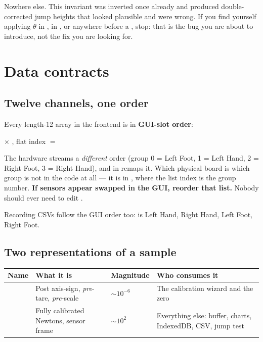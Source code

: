 \documentclass[11pt,a4paper]{article}
\begin{document}
Nowhere else. This invariant was inverted once already and produced
double-corrected jump heights that looked plausible and were wrong. If you find
yourself applying $\theta$ in , in ,
or anywhere before a , stop: that is the bug you are about to
introduce, not the fix you are looking for.

\section{Data contracts}

\subsection{Twelve channels, one order}

Every length-12 array in the frontend is in \textbf{GUI-slot order}:

\begin{center}
 $\times$ ,
\quad flat index $=$ 
\end{center}

The hardware streams a \emph{different} order (group 0 = Left Foot, 1 = Left
Hand, 2 = Right Foot, 3 = Right Hand), and  in  remaps it. Which physical board is which group
is not in the code at all --- it is  in
, where the list index is the group number.
\textbf{If sensors appear swapped in the GUI, reorder that list.} Nobody should
ever need to edit .

Recording CSVs follow the GUI order too:  is Left Hand,  Right
Hand,  Left Foot,  Right Foot.

\subsection{Two representations of a sample}

\begin{center}
\begin{tabular}{@{}L{2.4cm}L{4.1cm}L{2.2cm}L{6.4cm}@{}}
\toprule
\textbf{Name} & \textbf{What it is} & \textbf{Magnitude} & \textbf{Who consumes it} \\
\midrule
{} & Post axis-sign, \emph{pre}-tare, \emph{pre}-scale & $\sim10^{-6}$ & The calibration wizard and the zero \\
 & Fully calibrated Newtons, sensor frame & $\sim10^{2}$ & Everything else: buffer, charts, IndexedDB, CSV, jump test \\
\bottomrule
\end{tabular}
\end{center}
\end{document}
